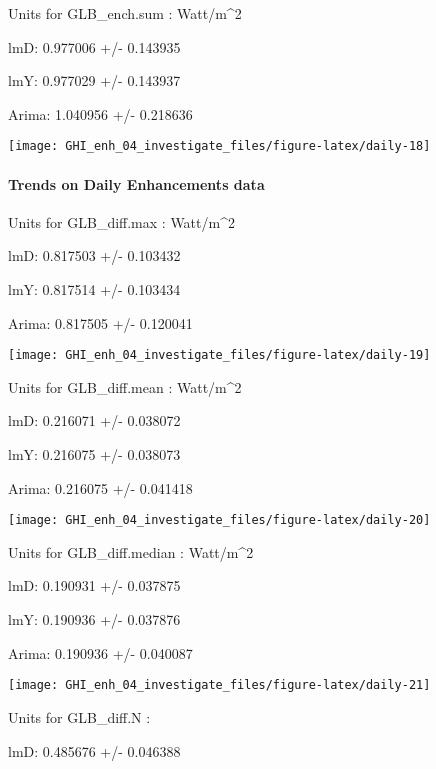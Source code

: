 \documentclass[
  10pt,
  a4paper,oneside]{article}
\begin{document}
Units for GLB\_ench.sum : Watt/m\^{}2

lmD: 0.977006 +/- 0.143935

lmY: 0.977029 +/- 0.143937

Arima: 1.040956 +/- 0.218636

\begin{center}\texttt{[image: GHI\_enh\_04\_investigate\_files/figure-latex/daily-18]} \end{center}

\newpage

\hypertarget{trends-on-daily-enhancements-data}{%
\paragraph{Trends on Daily Enhancements data}\label{trends-on-daily-enhancements-data}}

Units for GLB\_diff.max : Watt/m\^{}2

lmD: 0.817503 +/- 0.103432

lmY: 0.817514 +/- 0.103434

Arima: 0.817505 +/- 0.120041

\begin{center}\texttt{[image: GHI\_enh\_04\_investigate\_files/figure-latex/daily-19]} \end{center}

Units for GLB\_diff.mean : Watt/m\^{}2

lmD: 0.216071 +/- 0.038072

lmY: 0.216075 +/- 0.038073

Arima: 0.216075 +/- 0.041418

\begin{center}\texttt{[image: GHI\_enh\_04\_investigate\_files/figure-latex/daily-20]} \end{center}

Units for GLB\_diff.median : Watt/m\^{}2

lmD: 0.190931 +/- 0.037875

lmY: 0.190936 +/- 0.037876

Arima: 0.190936 +/- 0.040087

\begin{center}\texttt{[image: GHI\_enh\_04\_investigate\_files/figure-latex/daily-21]} \end{center}

Units for GLB\_diff.N :

lmD: 0.485676 +/- 0.046388
\end{document}
